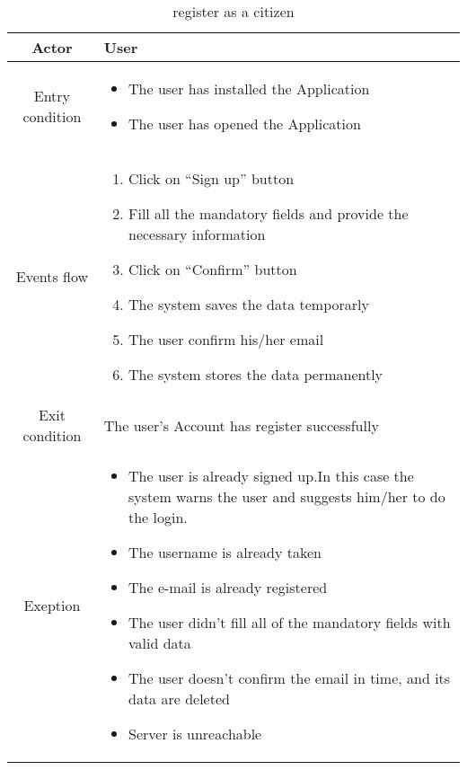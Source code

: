 \documentclass{article}
\begin{document}
		\begin{table} [H]
		\begin{center}
		\caption{register as a citizen}
		\begin{tabular}{|c|p{8cm}|}
			\hline
			Actor&User\\
			\hline
			Entry condition & \begin{itemize}
								\item The user has installed the Application
								\item The user has opened the Application
							\end{itemize}\\
			\hline
			Events flow & \begin{enumerate}
							\item Click on “Sign up” button
							\item Fill all the mandatory fields and provide the necessary information
							\item Click on “Confirm” button
							\item The system saves the data temporarly
							\item The user confirm his/her email
							\item The system stores the data permanently
							
						\end{enumerate}\\
			\hline
			Exit condition & The user's Account has register successfully\\
			\hline
			Exeption & \begin{itemize}
							\item The user is already signed up.In this case the system warns the user and suggests him/her to do the login.
							\item The username is already taken
							\item The e-mail is already registered
							\item The user didn’t fill all of the mandatory fields with valid data
							\item The user doesn't confirm the email in time, and its data are deleted
							\item Server is unreachable
						\end{itemize}\\
			\hline
		\end{tabular}	
		\end{center}
		\end{table} 
\end{document}

